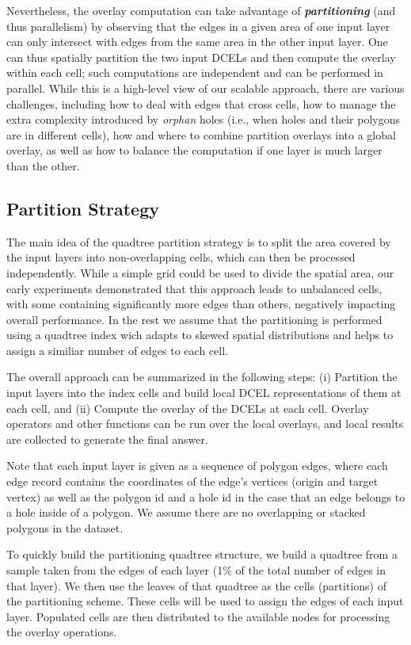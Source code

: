 Nevertheless, the overlay computation can take advantage of \textit{\textbf{partitioning}} (and thus parallelism) by observing that the edges in a given area of one input layer can only intersect with edges from the same area in the other input layer. One can thus spatially partition the two input DCELs and then compute the overlay within each cell; such computations are independent and can be performed in parallel. While this is a high-level view of our scalable approach, there are various challenges, including how to deal with edges that cross cells, how to manage the extra complexity introduced by \textit{orphan} holes (i.e., when holes and their polygons are in different cells), how and where to combine partition overlays into a global overlay, as well as how to balance the computation if one layer is much larger than the other.

\subsection{Partition Strategy} \label{sec:pstrategies}
The main idea of the quadtree partition strategy is to split the area covered by the input layers into non-overlapping cells, which can then be processed independently.  While a simple grid could be used to divide the spatial area, our early experiments demonstrated that this approach leads to unbalanced cells, with some containing significantly more edges than others, negatively impacting overall performance.  In the rest we assume that the partitioning is performed using a quadtree index wich adapts to skewed spatial distributions and helps to assign a similiar number of edges to each cell.

The overall approach can be summarized in the following steps: (i) Partition the input layers into the index cells and build local DCEL representations of them at each cell, and (ii) Compute the overlay of the DCELs at each cell. Overlay operators and other functions can be run over the local overlays, and local results are collected to generate the final answer.

Note that each input layer is given as a sequence of polygon edges, where each edge record contains the coordinates of the edge's vertices (origin and target vertex) as well as the polygon id and a hole id in the case that an edge belongs to a hole inside of a polygon. We assume there are no overlapping or stacked polygons in the dataset.

To quickly build the partitioning quadtree structure, we build a quadtree from a sample taken from the edges of each layer (1\% of the total number of edges in that layer). We then use the leaves of that quadtree as the cells (partitions) of the partitioning scheme. These cells will be used to assign the edges of each input layer. Populated cells are then distributed to the available nodes for processing the overlay operations.

